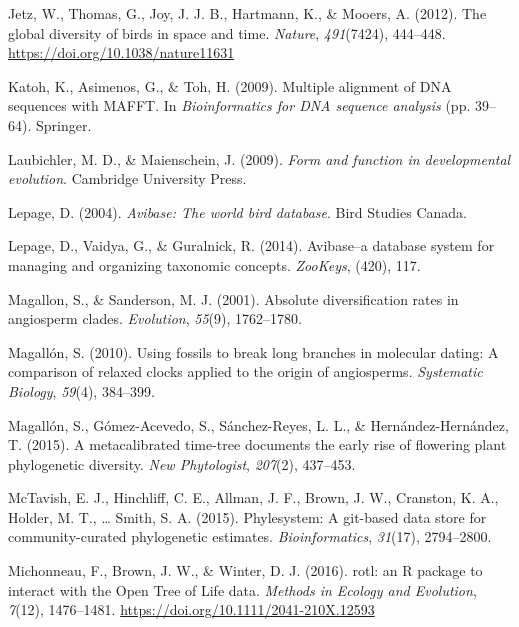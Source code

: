 \documentclass[
  english,
  man]{apa6}
\newlength{\cslhangindent}
\newlength{\cslentryspacingunit} %
\newenvironment{CSLReferences}[2] %
 {%
  \setlength{\parindent}{0pt}
  \ifodd #1
  \let\oldpar\par
  \def\par{\hangindent=\cslhangindent\oldpar}
  \fi
  \setlength{\parskip}{#2\cslentryspacingunit}
 }%
 {}
\begin{document}
\begin{CSLReferences}{1}{0}
\leavevmode{}%
Jetz, W., Thomas, G., Joy, J. J. B., Hartmann, K., \& Mooers, A. (2012). {The global diversity of birds in space and time}. \emph{Nature}, \emph{491}(7424), 444--448. \url{https://doi.org/10.1038/nature11631}

\leavevmode{}%
Katoh, K., Asimenos, G., \& Toh, H. (2009). Multiple alignment of DNA sequences with MAFFT. In \emph{Bioinformatics for DNA sequence analysis} (pp. 39--64). Springer.

\leavevmode{}%
Laubichler, M. D., \& Maienschein, J. (2009). \emph{Form and function in developmental evolution}. Cambridge University Press.

\leavevmode{}%
Lepage, D. (2004). \emph{Avibase: The world bird database}. Bird Studies Canada.

\leavevmode{}%
Lepage, D., Vaidya, G., \& Guralnick, R. (2014). Avibase--a database system for managing and organizing taxonomic concepts. \emph{ZooKeys}, (420), 117.

\leavevmode{}%
Magallon, S., \& Sanderson, M. J. (2001). Absolute diversification rates in angiosperm clades. \emph{Evolution}, \emph{55}(9), 1762--1780.

\leavevmode{}%
Magallón, S. (2010). Using fossils to break long branches in molecular dating: A comparison of relaxed clocks applied to the origin of angiosperms. \emph{Systematic Biology}, \emph{59}(4), 384--399.

\leavevmode{}%
Magallón, S., Gómez-Acevedo, S., Sánchez-Reyes, L. L., \& Hernández-Hernández, T. (2015). A metacalibrated time-tree documents the early rise of flowering plant phylogenetic diversity. \emph{New Phytologist}, \emph{207}(2), 437--453.

\leavevmode{}%
McTavish, E. J., Hinchliff, C. E., Allman, J. F., Brown, J. W., Cranston, K. A., Holder, M. T., \ldots{} Smith, S. A. (2015). Phylesystem: A git-based data store for community-curated phylogenetic estimates. \emph{Bioinformatics}, \emph{31}(17), 2794--2800.

\leavevmode{}%
Michonneau, F., Brown, J. W., \& Winter, D. J. (2016). {rotl: an R package to interact with the Open Tree of Life data}. \emph{{Methods in Ecology and Evolution}}, \emph{7}(12), 1476--1481. \url{https://doi.org/10.1111/2041-210X.12593}


\end{CSLReferences}
\end{document}
